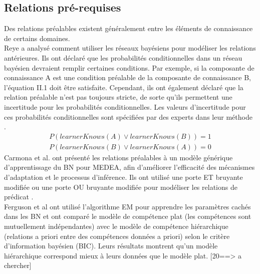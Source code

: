 \subsection{Relations pré-requises}
Des relations préalables existent généralement entre les éléments de connaissance de certains domaines. \\
Reye a analysé comment utiliser les réseaux bayésiens pour modéliser les relations antérieures. Ils ont déclaré que les probabilités conditionnelles dans un réseau bayésien devraient remplir certaines conditions. Par exemple, si la composante de connaissance A est une condition préalable de la composante de connaissance B, l'équation II.1 doit être satisfaite. Cependant, ils ont également déclaré que la relation préalable n'est pas toujours stricte, de sorte qu'ils permettent une incertitude pour les probabilités conditionnelles. Les valeurs d'incertitude pour ces probabilités conditionnelles sont spécifiées par des experts dans leur méthode \cite{Student_Modelling_Based_on_Belief_Networks}.
\begin{equation}
	\begin{split}
		P(learnerKnows(A) \vee  learnerKnows(B)) = 1\\
	P(learnerKnows(B) \vee learnerKnows(A)) = 0
	\end{split}
\end{equation}
Carmona et al. ont présenté les relations préalables à un modèle générique d'apprentissage du BN pour MEDEA, afin d'améliorer l'efficacité des mécanismes d'adaptation et le processus d'inférence. Ils ont utilisé une porte ET bruyante modifiée ou une porte OU bruyante modifiée pour modéliser les relations de prédicat \cite{Prerequisite_Relations_in_Multilayered_Bayesian_Student_Model}. \\
Ferguson et al ont utilisé l'algorithme EM pour apprendre les paramètres cachés dans les BN et ont comparé le modèle de compétence plat (les compétences sont mutuellement indépendantes) avec le modèle de compétence hiérarchique (relations a priori entre des compétences données a priori) selon le critère d'information bayésien (BIC). Leurs résultats montrent qu'un modèle hiérarchique correspond mieux à leurs données que le modèle plat. [20==> a chercher]

